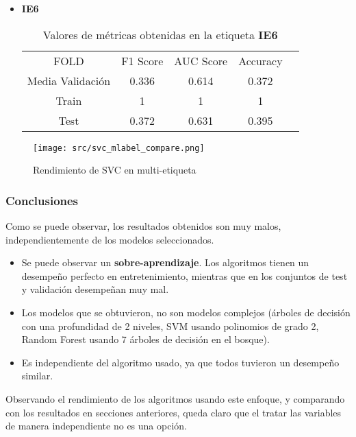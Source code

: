 \begin{itemize}
\begin{table}[H]
	      \end{table}
	\item  \textbf{IE6}
	      \begin{table}[H]
		      \centering
		      \begin{tabular}{|c|c|c|c|c}
			      \cline{1-4}
			      FOLD             & F1 Score & AUC Score & Accuracy \\ \cline{1-4}
			      Media Validación & 0.336    & 0.614     & 0.372    \\ \cline{1-4}
			      Train            & 1        & 1         & 1        \\ \cline{1-4}
			      Test             & 0.372    & 0.631     & 0.395    \\ \cline{1-4}
		      \end{tabular}
		      \caption{Valores de métricas obtenidas en la etiqueta \textbf{IE6}}
	      \end{table}
\end{itemize}

\begin{figure}[H]
	\centering
	\texttt{[image: src/svc\_mlabel\_compare.png]}
	\caption{Rendimiento de SVC en multi-etiqueta}
	\label{fig:svcml_cmp}
\end{figure}
\subsubsection*{Conclusiones}
Como se puede observar, los resultados obtenidos son muy malos, independientemente de los modelos seleccionados.
\begin{itemize}
	\item Se puede observar un \textbf{sobre-aprendizaje}. Los algoritmos tienen un desempeño perfecto en entretenimiento, mientras que en los conjuntos de test y validación desempeñan muy mal.
	\item Los modelos que se obtuvieron, no son modelos complejos (árboles de decisión con una profundidad de 2 niveles, SVM usando polinomios de grado 2, Random Forest usando 7 árboles de decisión en el bosque).
	\item Es independiente del algoritmo usado, ya que todos tuvieron un desempeño similar.
\end{itemize}
Observando el rendimiento de los algoritmos usando este enfoque, y comparando con los resultados en secciones anteriores, queda claro que el tratar las variables de manera independiente no es una opción.
